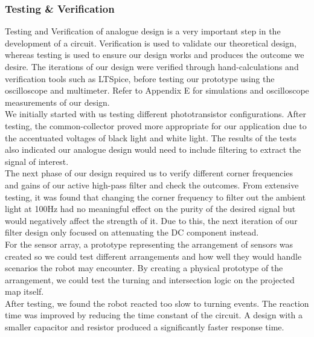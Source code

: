 \subsubsection*{Testing \& Verification}
Testing and Verification of analogue design is a very important step in the development of a circuit. Verification is used to validate our theoretical design, whereas testing is used to ensure our design works and produces the outcome we desire. The iterations of our design were verified through hand-calculations and verification tools such as LTSpice, before testing our prototype using the oscilloscope and multimeter. Refer to Appendix E for simulations and oscilloscope measurements of our design.
\\We initially started with us testing different phototransistor configurations. After testing, the common-collector proved more appropriate for our application due to the accentuated voltages of black light and white light. The results of the tests also indicated our analogue design would need to include filtering to extract the signal of interest. 
\\The next phase of our design required us to verify different corner frequencies and gains of our active high-pass filter and check the outcomes. From extensive testing, it was found that changing the corner frequency to filter out the ambient light at 100Hz had no meaningful effect on the purity of the desired signal but would negatively affect the strength of it. Due to this, the next iteration of our filter design only focused on attenuating the DC component instead.
\\For the sensor array, a prototype representing the arrangement of sensors was created so we could test different arrangements and how well they would handle scenarios the robot may encounter. By creating a physical prototype of the arrangement, we could test the turning and intersection logic on the projected map itself.
\\After testing, we found the robot reacted too slow to turning events. The reaction time was improved by reducing the time constant of the circuit. A design with a smaller capacitor and resistor produced a significantly faster response time.

